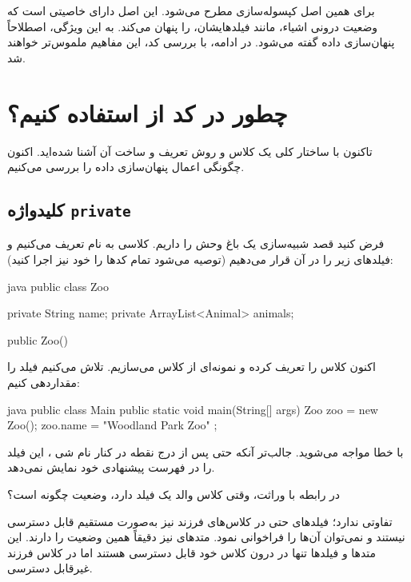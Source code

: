 برای همین اصل کپسوله‌سازی مطرح می‌شود. این اصل دارای خاصیتی است که وضعیت
درونی اشیاء، مانند فیلدهایشان، را پنهان می‌کند. به این ویژگی، اصطلاحاً
پنهان‌سازی داده  گفته می‌شود. در ادامه، با بررسی کد، این
مفاهیم ملموس‌تر خواهند شد.

\section{چطور در کد از  استفاده کنیم؟}

تاکنون با ساختار کلی یک کلاس و روش تعریف و ساخت آن آشنا شده‌اید. اکنون
چگونگی اعمال پنهان‌سازی داده را بررسی می‌کنیم.

\subsection{کلیدواژه \texttt{private}}

فرض کنید قصد شبیه‌سازی یک باغ وحش را داریم. کلاسی به نام
 تعریف می‌کنیم و فیلدهای زیر را در آن قرار می‌دهیم (توصیه
می‌شود تمام کدها را خود نیز اجرا کنید):

\begin{codebox}{java}
public class Zoo {
    private String name;
    private ArrayList<Animal> animals;
    
    public Zoo(){  
    }  
}
\end{codebox}

اکنون کلاس  را تعریف کرده و نمونه‌ای از کلاس
 می‌سازیم. تلاش می‌کنیم فیلد  را
مقداردهی کنیم:

\begin{codebox}{java}
public class Main {  
    public static void main(String[] args) {  
        Zoo zoo = new Zoo();  
        zoo.name = "Woodland Park Zoo" ;  
    }  
}
\end{codebox}

با خطا مواجه می‌شوید. جالب‌تر آنکه حتی پس از درج نقطه در کنار نام شی
 ،  این فیلد را در فهرست پیشنهادی خود نمایش
نمی‌دهد.

در رابطه با وراثت، وقتی کلاس والد یک فیلد  دارد،
وضعیت چگونه است؟

تفاوتی ندارد؛ فیلدهای  حتی در کلاس‌های فرزند نیز
به‌صورت مستقیم قابل دسترسی نیستند و نمی‌توان آن‌ها را فراخوانی نمود. متدهای
 نیز دقیقاً همین وضعیت را دارند. این متدها و فیلدها
تنها در درون کلاس خود قابل دسترسی هستند اما در کلاس فرزند غیرقابل
دسترسی.

